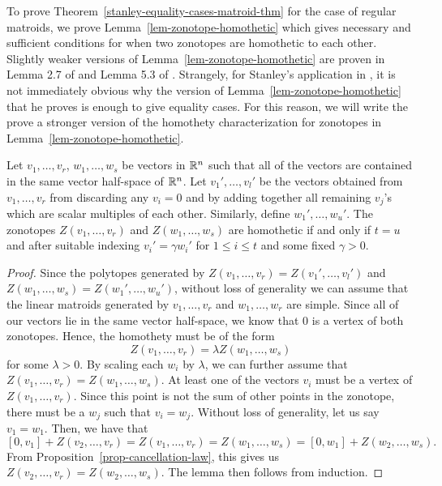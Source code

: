 \documentclass{puthesis-UG}
\begin{document}
To prove Theorem~\ref{stanley-equality-cases-matroid-thm} for the case of regular matroids, we prove Lemma~\ref{lem-zonotope-homothetic} which gives necessary and sufficient conditions for when two zonotopes are homothetic to each other. Slightly weaker versions of Lemma~\ref{lem-zonotope-homothetic} are proven in Lemma 2.7 of \cite{STANLEY} and Lemma 5.3 of \cite{Kato_2007}. Strangely, for Stanley's application in \cite{STANLEY}, it is not immediately obvious why the version of Lemma~\ref{lem-zonotope-homothetic} that he proves is enough to give equality cases. For this reason, we will write the prove a stronger version of the homothety characterization for zonotopes in Lemma~\ref{lem-zonotope-homothetic}. 

\begin{lem} \label{lem-zonotope-homothetic}
	Let $v_1, \ldots, v_r$, $w_1, \ldots, w_s$ be vectors in $\mathbb{R}^n$ such that all of the vectors are contained in the same vector half-space of $\mathbb{R}^n$. Let $v_1', \ldots, v_l'$ be the vectors obtained from $v_1, \ldots, v_r$ from discarding any $v_i = 0$ and by adding together all remaining $v_j$'s which are scalar multiples of each other. Similarly, define $w_1', \ldots, w_u'$. The zonotopes $Z(v_1, \ldots, v_r)$ and $Z(w_1, \ldots, w_s)$ are homothetic if and only if $t = u$ and after suitable indexing $v_i' = \gamma w_i'$ for $1 \leq i \leq t$ and some fixed $\gamma > 0$. 
\end{lem}

\begin{proof}
 	Since the polytopes generated by $Z(v_1, \ldots, v_r) = Z(v_1', \ldots, v_l')$ and $Z(w_1, \ldots, w_s) = Z(w_1', \ldots, w_u')$, without loss of generality we can assume that the linear matroids generated by $v_1, \ldots, v_r$ and $w_1, \ldots, w_r$ are simple. Since all of our vectors lie in the same vector half-space, we know that $0$ is a vertex of both zonotopes. Hence, the homothety must be of the form 
 	\[
 		Z(v_1, \ldots, v_r) = \lambda Z(w_1, \ldots, w_s)
 	\] 
 	for some $\lambda > 0$. By scaling each $w_i$ by $\lambda$, we can further assume that $Z(v_1, \ldots, v_r) = Z(w_1, \ldots, w_s)$. At least one of the vectors $v_i$ must be a vertex of $Z(v_1, \ldots, v_r)$. Since this point is not the sum of other points in the zonotope, there must be a $w_j$ such that $v_i = w_j$. Without loss of generality, let us say $v_1 = w_1$. Then, we have that 
 	\[
 		[0, v_1] + Z(v_2, \ldots, v_r) = Z(v_1, \ldots, v_r) = Z(w_1, \ldots, w_s) = [0, w_1] +Z(w_2, \ldots, w_s).
 	\]
 	From Proposition~\ref{prop-cancellation-law}, this gives us $Z(v_2, \ldots, v_r) = Z(w_2, \ldots, w_s)$. The lemma then follows from induction.  
\end{proof}
\end{document}
